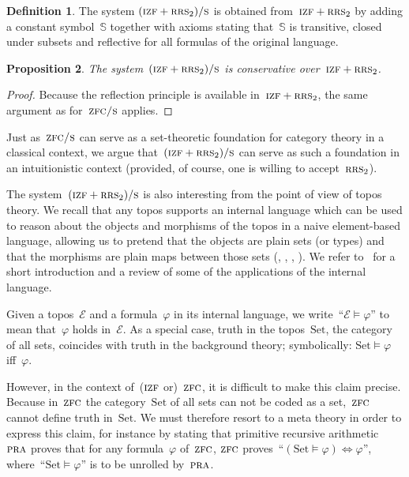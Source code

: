 \documentclass[oneside,reqno]{amsart}
\theoremstyle{definition}
\newtheorem{defn}{Definition}[section]
\theoremstyle{plain}
\newtheorem{prop}[defn]{Proposition}
\theoremstyle{remark}
\newcommand{\E}{\mathcal{E}}
\renewcommand{\SS}{\mathbb{S}}
\newcommand{\Set}{\mathrm{Set}}
\renewcommand{\_}{\mathpunct{.}\,}
\newcommand{\?}{\,{:}\,}
\newcommand{\PRA}{\textsc{pra}}
\newcommand{\IZF}{\textsc{izf}}
\newcommand{\ZFC}{\textsc{zfc}}
\newcommand{\ZFCS}{\textsc{zfc/s}}
\newcommand{\RRS}{\textsc{rrs}}
\newcommand{\ES}{(\IZF+\RRS_2)/\textsc{s}}
\begin{document}
\begin{defn}The system $\ES$ is obtained from~$\IZF+\RRS_2$ by
adding a constant symbol~$\SS$ together with axioms
stating that~$\SS$ is transitive, closed under subsets and reflective for all
formulas of the original language.\end{defn}

\begin{prop}The system~$\ES$ is conservative
over~$\IZF+\RRS_2$.\end{prop}

\begin{proof}Because the reflection principle is available in~$\IZF+\RRS_2$,
the same argument as for~$\ZFCS$ applies.\end{proof}

Just as~$\ZFCS$ can serve as a set-theoretic foundation for category theory in
a classical context, we argue that~$\ES$ can serve as such a foundation in an
intuitionistic context (provided, of course, one is willing to
accept~$\RRS_2$).

The system~$\ES$ is also interesting from the point of view of topos theory.
We recall that any topos supports an internal language which can be used to reason about the
objects and morphisms of the topos in a naive element-based language, allowing
us to pretend that the objects are plain sets (or types) and that the morphisms
are plain maps between those sets (\cite[Chapter~6]{borceux:handbook3},
\cite[Section~1.3]{caramello:ttt}, \cite[Chapter~14]{goldblatt:topoi},
\cite[Chapter~VI]{moerdijk-maclane:sheaves-logic}). We refer
to~\cite[Sections~1 and~2]{blechschmidt:phd} for a short introduction and a
review of some of the applications of the internal language.

Given a topos~$\mathcal{E}$ and a formula~$\varphi$ in its internal language,
we write~``$\mathcal{E} \models \varphi$'' to mean that~$\varphi$ holds
in~$\E$. As a special case, truth in the topos~$\Set$, the category of all sets,
coincides with truth in the background theory; symbolically: $\Set \models
\varphi$ iff~$\varphi$.

However, in the context of~($\IZF$ or)~$\ZFC$, it is difficult to make this
claim precise. Because in~$\ZFC$ the category~$\Set$ of all sets can not be
coded as a set,~$\ZFC$ cannot define truth in~$\Set$. We must therefore resort
to a meta theory in order to express this claim, for instance by stating
that primitive recursive arithmetic~$\PRA$ proves that for any
formula~$\varphi$ of~$\ZFC$, $\ZFC$ proves~``$(\Set \models \varphi)
\Leftrightarrow \varphi$'', where~``$\Set \models \varphi$'' is to be unrolled
by~$\PRA$.
\end{document}
